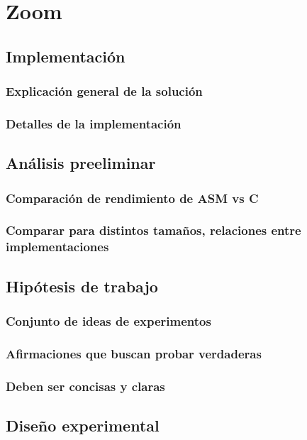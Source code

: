 \section{Zoom}

\subsection{Implementación}
\subsubsection*{Explicación general de la solución}
\subsubsection*{Detalles de la implementación}


\subsection{Análisis preeliminar}
\subsubsection*{Comparación de rendimiento de ASM vs C}
\subsubsection*{Comparar para distintos tamaños, relaciones entre implementaciones}

\subsection{Hipótesis de trabajo}
\subsubsection*{Conjunto de ideas de experimentos}
\subsubsection*{Afirmaciones que buscan probar verdaderas}
\subsubsection*{Deben ser concisas y claras}

\subsection{Diseño experimental}
